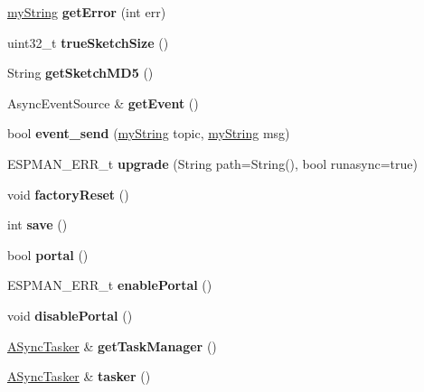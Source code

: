 \begin{DoxyCompactItemize}
\hyperlink{class_e_s_p_m_a_n_1_1my_string}{my\+String} {\bfseries get\+Error} (int err)
\item 
\mbox{\label{class_e_s_pmanager_a8b05b608f891bbe67d3742d749620db8}} 
uint32\+\_\+t {\bfseries true\+Sketch\+Size} ()
\item 
\mbox{\label{class_e_s_pmanager_ac4cd153ca61c45180fa138431a2eaaf2}} 
String {\bfseries get\+Sketch\+M\+D5} ()
\item 
\mbox{\label{class_e_s_pmanager_ad620b2481d8b8d575f21c8f70f069235}} 
Async\+Event\+Source \& {\bfseries get\+Event} ()
\item 
\mbox{\label{class_e_s_pmanager_aaa81ea53d94f2ffce01ab0eb13902cc3}} 
bool {\bfseries event\+\_\+send} (\hyperlink{class_e_s_p_m_a_n_1_1my_string}{my\+String} topic, \hyperlink{class_e_s_p_m_a_n_1_1my_string}{my\+String} msg)
\item 
\mbox{\label{class_e_s_pmanager_a0a5acca1b6d70a357774b07986c38ea5}} 
E\+S\+P\+M\+A\+N\+\_\+\+E\+R\+R\+\_\+t {\bfseries upgrade} (String path=String(), bool runasync=true)
\item 
\mbox{\label{class_e_s_pmanager_a5974ea776024c990c28376fd237515ed}} 
void {\bfseries factory\+Reset} ()
\item 
\mbox{\label{class_e_s_pmanager_ad1796ea349f45a0246f6d344f83f0614}} 
int {\bfseries save} ()
\item 
\mbox{\label{class_e_s_pmanager_a9a8d0c15671c93f559ba6ab67c41a43f}} 
bool {\bfseries portal} ()
\item 
\mbox{\label{class_e_s_pmanager_a918d341439796101a03f7fd8105db9e6}} 
E\+S\+P\+M\+A\+N\+\_\+\+E\+R\+R\+\_\+t {\bfseries enable\+Portal} ()
\item 
\mbox{\label{class_e_s_pmanager_a9c392a712f02fb7ca1c54783f7b45ab4}} 
void {\bfseries disable\+Portal} ()
\item 
\mbox{\label{class_e_s_pmanager_a8f715e70f0711cedafdd5b3f1b58aacb}} 
\hyperlink{class_tasker}{A\+Sync\+Tasker} \& {\bfseries get\+Task\+Manager} ()
\item 
\mbox{\label{class_e_s_pmanager_ab0858c128085f2bd12a17261e8fefe52}} 
\hyperlink{class_tasker}{A\+Sync\+Tasker} \& {\bfseries tasker} ()
\end{DoxyCompactItemize}
